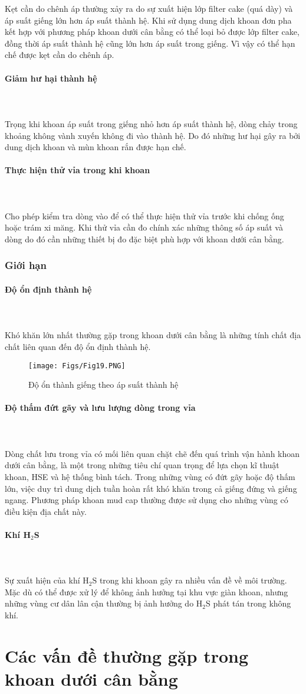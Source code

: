 \documentclass[12pt,a4paper]{article}
\newcommand{\subsubsubsection}[1]{\paragraph{#1}\mbox{}\\}
\begin{document}
		Kẹt cần do chênh áp thường xảy ra do sự xuất hiện lớp filter cake (quá dày) và áp suất giếng lớn hơn áp suất thành hệ. Khi sử dụng dung dịch khoan đơn pha kết hợp với phương pháp khoan dưới cân bằng có thể loại bỏ được lớp filter cake, đồng thời áp suất thành hệ cũng lớn hơn áp suất trong giếng. Vì vậy có thể hạn chế được kẹt cần do chênh áp.
		\subsubsubsection{Giảm hư hại thành hệ}\\
		Trọng khi khoan áp suất trong giếng nhỏ hơn áp suất thành hệ, dòng chảy trong khoảng không vành xuyến không đi vào thành hệ. Do đó những hư hại gây ra bởi dung dịch khoan và mùn khoan rắn được hạn chế.
		\subsubsubsection{Thực hiện thử vỉa trong khi khoan}\\
		Cho phép kiểm tra dòng vào để có thể thực hiện thử vỉa trước khi chống ống hoặc trám xi măng. Khi thử vỉa cần đo chính xác những thông số áp suất và dòng do đó cần những thiết bị đo đặc biệt phù hợp với khoan dưới cân bằng.
	\subsubsection{Giới hạn}
		\subsubsubsection{Độ ổn định thành hệ}\\
		Khó khăn lớn nhất thường gặp trong khoan dưới cân bằng là những tính chất địa chất liên quan đến độ ổn định thành hệ.
			\begin{figure}[h]
				\centering
				\texttt{[image: Figs/Fig19.PNG]}
				\caption{Độ ổn thành giếng theo áp suất thành hệ\cite{rehm2013underbalanced}}
			\end{figure}
		\subsubsubsection{Độ thấm đứt gãy và lưu lượng dòng trong vỉa}\\
		Dòng chất lưu trong vỉa có mối liên quan chặt chẽ đến quá trình vận hành khoan dưới cân bằng, là một trong những tiêu chí quan trọng để lựa chọn kĩ thuật khoan, HSE và hệ thống bình tách. Trong những vùng có đứt gãy hoặc độ thấm lớn, việc duy trì dung dịch tuần hoàn rất khó khăn trong cả giếng đứng và giếng ngang. Phương pháp khoan mud cap thường được sử dụng cho những vùng có điều kiện địa chất này.
		\subsubsubsection{Khí H\texorpdfstring{$_2$}{2}S}\\
		Sự xuất hiện của khí H$_2$S trong khi khoan gây ra nhiều vấn đề về môi trường. Mặc dù có thể được xử lý để không ảnh hưởng tại khu vực giàn khoan, nhưng những vùng cư dân lân cận thường bị ảnh hưởng do H$_2$S phát tán trong không khí.

\section{Các vấn đề thường gặp trong khoan dưới cân bằng}
\end{document}

